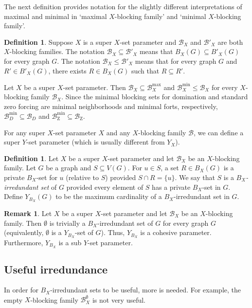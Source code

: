 \documentclass{article}
\numberwithin{figure}{section}
\numberwithin{table}{section}
\numberwithin{equation}{section}
\theoremstyle{definition}
\newtheorem{rem}[thm]{Remark}
\theoremstyle{definition}
\newtheorem{defn}[thm]{Definition}
\theoremstyle{definition}
\newcommand{\B}{\mathcal{B}}
\newcommand{\Z}{\operatorname{Z}}
\begin{document}
The next definition provides notation for the slightly different interpretations of maximal and minimal in `maximal $X$-blocking family' and `minimal $X$-blocking family'.

\begin{defn} Suppose $X$ is a super $X$-set parameter and  $\B_X$ and $\B'_X$ are both $X$-blocking families.  
The notation $\B_X\subseteq \B'_X$ means that $B_X(G)\subseteq B'_X(G)$ for every graph $G$. 
The notation $\B_X\leq \B'_X$ means that for every graph $G$ and $R'\in B'_X(G)$, there exists $R\in B_X(G)$ such that $R\subseteq R'$.  
\end{defn}

Let $X$ be a super $X$-set parameter. Then $\B_X\subseteq \B_X^{\max}$ and $\B_X^{\min}\le \B_X$ for every $X$-blocking family $\B_X$.  Since the minimal blocking sets for domination and standard zero forcing are minimal neighborhoods and minimal forts, respectively,  $\B_D^{\min}\subseteq \B_D$ and $\B_{\Z}^{\min}\subseteq \B_{\Z}$.







 For any super $X$-set parameter $X$ 
 and any $X$-blocking family $\B$, we can define a super $Y$-set parameter  (which is usually different from $Y_X$). 
 
 
 \begin{defn} Let $X$ be a super $X$-set parameter and let $\B_X$ be an $X$-blocking family.  Let $G$ be a graph and $S\subseteq V(G)$. For $u\in S$, a set $R\in B_X(G)$ is a private $B_X$-set for $u$ (relative to $S$) provided $S\cap R = \{u\}$. We say that $S$ is a \emph{$B_X$-irredundant set}  of $G$ provided every element of $S$ has a private $B_X$-set  in $G$. Define $Y_{B_X}(G)$ to be the maximum cardinality of a $B_X$-irredundant set  in $G$.
 \end{defn}


\begin{rem}\label{rem: blocking gives sub param}
Let $X$ be a super $X$-set parameter and let $\B_X$ be an $X$-blocking family. Then $\emptyset$ is trivially a $B_X$-irredundant set of $G$ for every graph $G$ (equivalently, $\emptyset$ is a $Y_{B_X}$-set of $G$). Thus, $Y_{B_X}$ is a cohesive parameter.   Furthermore, $Y_{B_X}$ is a sub $Y$-set parameter. 
\end{rem}


 


 \subsection{Useful irredundance}\label{ss:irred}
   In order for $B_X$-irredundant sets to be useful, more is needed. For example, the empty $X$-blocking family $\B_X^{\emptyset}$ is not very useful. 
\end{document}
